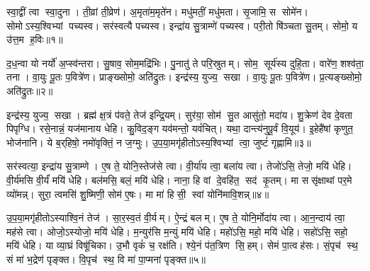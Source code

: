 

\clearpage
{}
\setcounter{anuvakam}{0}
स्वा॒द्वीं त्वा स्वा॒दुना। ती॒व्रां ती॒व्रेण॑। अ॒मृता॑म॒मृते॑न। मधु॑मतीं॒ मधु॑मता। सृ॒जामि॒ स सोमे॑न। सोमोऽस्य॒श्विभ्यां पच्यस्व। सर॑स्वत्यै पच्यस्व। इन्द्रा॑य सु॒त्राम्णे॑ पच्यस्व। परी॒तो षि॑ञ्चता सु॒तम्। सोमो॒ य उ॑त्त॒म ह॒विः॥१॥

द॒ध॒न्वा यो नर्यो॑ अ॒प्स्व॑न्तरा। सु॒षाव॒ सोम॒मद्रि॑भिः। पु॒नातु॑ ते परि॒स्रुतम्। सोम॒ सूर्य॑स्य दुहि॒ता। वारे॑ण॒ शश्व॑ता॒ तना। वा॒युः पू॒तः प॒वित्रे॑ण। प्राङ्ख्सोमो॒ अति॑द्रुतः। इन्द्र॑स्य॒ युज्य॒ सखा। वा॒युः पू॒तः प॒वित्रे॑ण। प्र॒त्यङ्ख्सोमो॒ अति॑द्रुतः॥२॥

इन्द्र॑स्य॒ युज्य॒ सखा। ब्रह्म॑ क्ष॒त्रं प॑वते॒ तेज॑ इन्द्रि॒यम्। सुर॑या॒ सोम॑ सु॒त आसु॑तो॒ मदा॑य। शु॒क्रेण॑ देव दे॒वता पिपृग्धि। रसे॒नान्नं॒ यज॑मानाय धेहि। कु॒विद॒ङ्ग यव॑मन्तो॒ यवं॑चित्। यथा॒ दान्त्य॑नुपू॒र्वं वि॒यूय॑। इ॒हेहै॑षां कृणुत॒ भोज॑नानि। ये ब॒र्‌हिषो॒ नमो॑वृक्तिं॒ न ज॒ग्मुः। उ॒प॒या॒मगृ॑हीतोऽस्य॒श्विभ्यां त्वा॒ जुष्टं॑ गृह्णामि॥३॥

सर॑स्वत्या॒ इन्द्रा॑य सु॒त्राम्णे। ए॒ष ते॒ योनि॒स्तेज॑से त्वा। वी॒र्या॑य त्वा॒ बला॑य त्वा। तेजो॑ऽसि॒ तेजो॒ मयि॑ धेहि। वी॒र्य॑मसि वी॒र्यं॑ मयि॑ धेहि। बल॑मसि॒ बलं॒ मयि॑ धेहि। नाना॒ हि वां दे॒वहि॑त॒ सद॑ कृ॒तम्। मा ससृ॑क्षाथां पर॒मे व्यो॑मन्न्। सुरा॒ त्वमसि॑ शु॒ष्मिणी॒ सोम॑ ए॒षः। मा मा॑ हिसी॒ स्वां योनि॑मावि॒शन्न्॥४॥

उ॒प॒या॒मगृ॑हीतोऽस्याश्वि॒नं तेज॑। सा॒र॒स्व॒तं वी॒र्यम्। ऐ॒न्द्रं बलम्। ए॒ष ते॒ योनि॒र्मोदा॑य त्वा। आ॒न॒न्दाय॑ त्वा॒ मह॑से त्वा। ओजो॒ऽस्योजो॒ मयि॑ धेहि। म॒न्युर॑सि म॒न्युं मयि॑ धेहि। महो॑ऽसि॒ महो॒ मयि॑ धेहि। सहो॑ऽसि॒ सहो॒ मयि॑ धेहि। या व्या॒घ्रं विषू॑चिका। उ॒भौ वृकं॑ च॒ रक्ष॑ति। श्ये॒नं प॑त॒त्रिण सि॒हम्। सेमं पा॒त्वह॑सः। सं॒पृच॑ स्थ॒ सं मा॑ भ॒द्रेण॑ पृङ्क्त। वि॒पृच॑ स्थ॒ वि मा॑ पा॒प्मना॑ पृङ्क्त॥५॥\anuvakamend[ह॒विः प्र॒त्यङ्ख्सोमो॒ अति॑द्रुतो गृह्णाम्यावि॒शन्विषू॑चिका॒ पञ्च॑ च]

